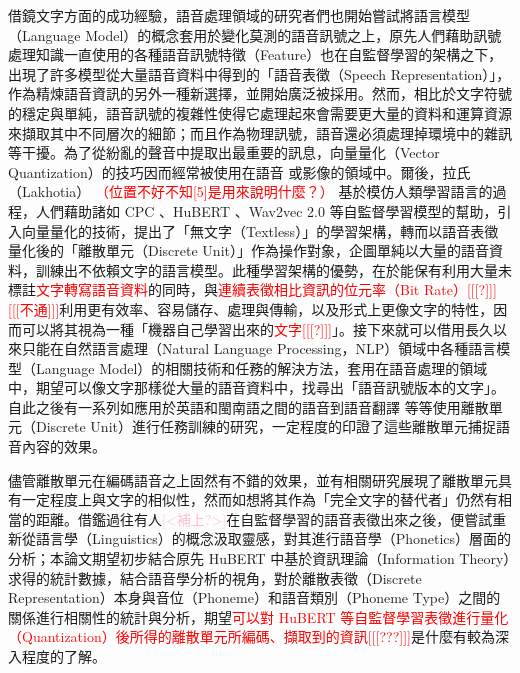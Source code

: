 借鏡文字方面的成功經驗，語音處理領域的研究者們也開始嘗試將語言模型（Language Model）的概念套用於變化莫測的語音訊號之上，原先人們藉助訊號處理知識一直使用的各種語音訊號特徵（Feature）也在自監督學習的架構之下，出現了許多模型從大量語音資料中得到的「語音表徵（Speech Representation）」，作為精煉語音資訊的另外一種新選擇，並開始廣泛被採用。然而，相比於文字符號的穩定與單純，語音訊號的複雜性使得它處理起來會需要更大量的資料和運算資源來擷取其中不同層次的細節；而且作為物理訊號，語音還必須處理掉環境中的雜訊等干擾。為了從紛亂的聲音中提取出最重要的訊息，向量量化（Vector Quantization）的技巧因而經常被使用在語音 \cite{chorowski_unsupervised_2019,chen_vector_2023,zhao_speech_2023} 或影像的領域中。爾後，拉氏（Lakhotia） \cite{lakhotia_generative_2021-1} \textcolor{red}{（位置不好不知[5]是用來說明什麼？）} 基於模仿人類學習語言的過程，人們藉助諸如 CPC \cite{oord_representation_2019}、HuBERT \cite{hsu_hubert_2021}、Wav2vec 2.0 \cite{baevski_wav2vec_2020} 等自監督學習模型的幫助，引入向量量化的技術，提出了「無文字（Textless）」的學習架構，轉而以語音表徵量化後的「離散單元（Discrete Unit）」作為操作對象，企圖單純以大量的語音資料，訓練出不依賴文字的語言模型。此種學習架構的優勢，在於能保有利用大量未標註\textcolor{red}{文字轉寫語音資料}的同時，與\textcolor{red}{連續表徵相比資訊的位元率（Bit Rate）[[[?]]][[[不通]]]}利用更有效率、容易儲存、處理與傳輸，以及形式上更像文字的特性，因而可以將其視為一種「機器自己學習出來的\textcolor{red}{文字[[[?]]]}」。接下來就可以借用長久以來只能在自然語言處理（Natural Language Processing，NLP）領域中各種語言模型（Language Model）的相關技術和任務的解決方法，套用在語音處理的領域中，期望可以像文字那樣從大量的語音資料中，找尋出「語音訊號版本的文字」。自此之後有一系列如應用於英語和閩南語之間的語音到語音翻譯 \cite{chen_speech--speech_2023} 等等使用離散單元（Discrete Unit）進行任務訓練的研究，一定程度的印證了這些離散單元捕捉語音內容的效果。

儘管離散單元在編碼語音之上固然有不錯的效果，並有相關研究展現了離散單元具有一定程度上與文字的相似性，然而如想將其作為「完全文字的替代者」仍然有相當的距離。借鑑過往有人\textcolor{pink}{[<補上?>]}在自監督學習的語音表徵出來之後，便嘗試重新從語言學（Linguistics）的概念汲取靈感，對其進行語音學（Phonetics）層面的分析；本論文期望初步結合原先 HuBERT 中基於資訊理論（Information Theory）求得的統計數據，結合語音學分析的視角，對於離散表徵（Discrete Representation）本身與音位（Phoneme）和語音類別（Phoneme Type）之間的關係進行相關性的統計與分析，期望\textcolor{red}{可以對 HuBERT 等自監督學習表徵進行量化（Quantization）後所得的離散單元所編碼、擷取到的資訊[[[???]]]}是什麼有較為深入程度的了解。

